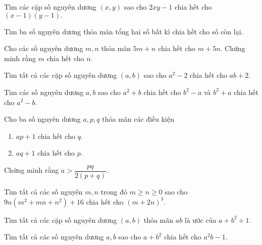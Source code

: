 \begin{btt}
Tìm các cặp số nguyên dương $(x,y)$ sao cho $2xy-1$ chia hết cho $(x-1)(y-1).$
\end{btt}

\begin{btt}
Tìm ba số nguyên dương thỏa mãn tổng hai số bất kì chia hết cho số còn lại.
\end{btt}

\begin{btt}
Cho các số nguyên dương $m,n$ thỏa mãn $5m+n$ chia hết cho $m+5n.$ Chứng minh rằng $m$ chia hết cho $n.$
\end{btt}

\begin{btt}
Tìm tất cả các cặp số nguyên dương $(a,b)$ sao cho $a^2-2$ chia hết cho $ab+2.$
\end{btt}

\begin{btt}
Tìm các số nguyên dương $a,b$ sao cho $a^2+b$ chia hết cho $b^2-a$ và $b^2+a$ chia hết cho $a^2-b.$
\end{btt}

\begin{btt}
Cho ba số nguyên dương $a, p, q$ thỏa mãn các điều kiện
\begin{multicols}{2}
\begin{enumerate}[i,]
        \item $ap+1$ chia hết cho $q.$
        \item $aq+1$ chia hết cho $p.$
\end{enumerate}
\end{multicols}
Chứng minh rằng  $a>\dfrac{pq}{2\left( p+q \right)}.$
\end{btt}

Tìm tất cả các số nguyên $m, n$ trong đó $m \geqslant n \geqslant 0$ sao cho $9n\left( {{m^2} + mn + {n^2}} \right) + 16$ chia hết cho ${\left( {m + 2n} \right)^3}$.

\begin{btt}
Tìm tất cả các cặp số nguyên dương $(a,b)$ thỏa mãn $ab$ là ước của $a+b^2+1.$
\end{btt}

\begin{btt}
Tìm tất cả các số nguyên dương $a,b$ sao cho $a+b^2$ chia hết cho $a^2b-1.$
\end{btt}

